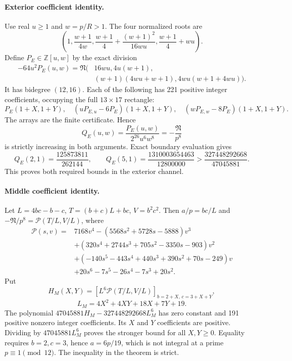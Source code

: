 \documentclass[11pt,reqno]{amsart}
\begin{document}
\paragraph{Exterior coefficient identity.}
Use real $u\ge1$ and $w=p/R>1$. The four normalized roots are
\[
 \left(1,\frac{w+1}{4w},\frac{w+1}{4}+\frac{(w+1)^2}{16wu},
                  \frac{w+1}{4}+wu\right).
\]
Define $P_E\in\mathbb Z[u,w]$ by the exact division
\begin{align*}
 -64u^2P_E(u,w)=\mathfrak N\bigl(&16wu,4u(w+1),\\
 &(w+1)(4wu+w+1),4wu(w+1+4wu)\bigr).
\end{align*}
It has bidegree $(12,16)$. Each of the following has 221 positive integer
coefficients, occupying the full $13\times17$ rectangle:
\[
 P_E(1+X,1+Y),\quad
 (uP_{E,u}-6P_E)(1+X,1+Y),\quad
 (wP_{E,w}-8P_E)(1+X,1+Y).
\]
The arrays are the finite certificate. Hence
\[
 Q_E(u,w)=\frac{P_E(u,w)}{2^{26}u^6w^8}
       =-\frac{\mathfrak N}{p^8}
\]
is strictly increasing in both arguments. Exact boundary evaluation gives
\[
 Q_E(2,1)=\frac{125873811}{262144},\qquad
 Q_E(5,1)=\frac{1310003654463}{12800000}
             >\frac{327448292668}{47045881}.
\]
This proves both required bounds in the exterior channel.

\paragraph{Middle coefficient identity.}
Let $L=4bc-b-c$, $T=(b+c)L+bc$, $V=b^2c^2$. Then $a/p=bc/L$ and
$-\mathfrak N/p^8=\mathcal P(T/L,V/L)$, where
\begin{align*}
\mathcal P(s,v)={}&7168v^4-(5568s^2+5728s-5888)v^3\\
&+(320s^4+2744s^3+705s^2-3350s-903)v^2\\
&+(-140s^5-443s^4+440s^3+390s^2+70s-249)v\\
&+20s^6-7s^5-26s^4-7s^3+20s^2.
\end{align*}
Put
\[
 H_M(X,Y)=\left[L^6\mathcal P(T/L,V/L)\right]_{b=2+X,\,c=3+X+Y},
\]
\[
 L_M=4X^2+4XY+18X+7Y+19.
\]
The polynomial $47045881H_M-327448292668L_M^6$ has zero constant and 191
positive nonzero integer coefficients. Its $X$ and $Y$ coefficients are
positive. Dividing by $47045881L_M^6$ proves the stronger bound for all
$X,Y\ge0$. Equality requires $b=2,c=3$, hence $a=6p/19$, which is not integral
at a prime $p\equiv1\pmod{12}$. The inequality in the theorem is strict.


\end{document}
